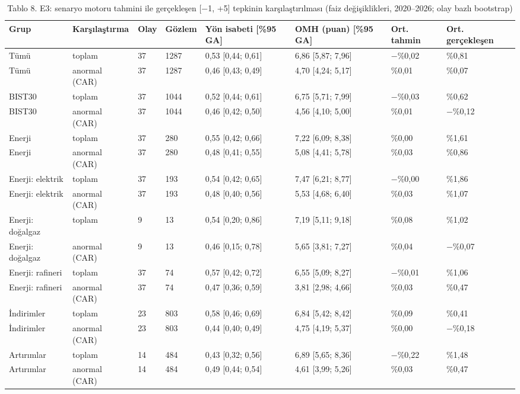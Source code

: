 \begin{table}
\caption{Tablo 8. E3: senaryo motoru tahmini ile gerçekleşen [−1, +5] tepkinin karşılaştırılması (faiz değişiklikleri, 2020–2026; olay bazlı bootstrap)}
\label{tab:tablo_08_e3_olay_calismasi}
\begin{tabular}{llllllll}
\toprule
Grup & Karşılaştırma & Olay & Gözlem & Yön isabeti [\%95 GA] & OMH (puan) [\%95 GA] & Ort. tahmin & Ort. gerçekleşen \\
\midrule
Tümü & toplam & 37 & 1287 & 0,53 [0,44; 0,61] & 6,86 [5,87; 7,96] & −\%0,02 & \%0,81 \\
Tümü & anormal (CAR) & 37 & 1287 & 0,46 [0,43; 0,49] & 4,70 [4,24; 5,17] & \%0,01 & \%0,07 \\
BIST30 & toplam & 37 & 1044 & 0,52 [0,44; 0,61] & 6,75 [5,71; 7,99] & −\%0,03 & \%0,62 \\
BIST30 & anormal (CAR) & 37 & 1044 & 0,46 [0,42; 0,50] & 4,56 [4,10; 5,00] & \%0,01 & −\%0,12 \\
Enerji & toplam & 37 & 280 & 0,55 [0,42; 0,66] & 7,22 [6,09; 8,38] & \%0,00 & \%1,61 \\
Enerji & anormal (CAR) & 37 & 280 & 0,48 [0,41; 0,55] & 5,08 [4,41; 5,78] & \%0,03 & \%0,86 \\
Enerji: elektrik & toplam & 37 & 193 & 0,54 [0,42; 0,65] & 7,47 [6,21; 8,77] & −\%0,00 & \%1,86 \\
Enerji: elektrik & anormal (CAR) & 37 & 193 & 0,48 [0,40; 0,56] & 5,53 [4,68; 6,40] & \%0,03 & \%1,07 \\
Enerji: doğalgaz & toplam & 9 & 13 & 0,54 [0,20; 0,86] & 7,19 [5,11; 9,18] & \%0,08 & \%1,02 \\
Enerji: doğalgaz & anormal (CAR) & 9 & 13 & 0,46 [0,15; 0,78] & 5,65 [3,81; 7,27] & \%0,04 & −\%0,07 \\
Enerji: rafineri & toplam & 37 & 74 & 0,57 [0,42; 0,72] & 6,55 [5,09; 8,27] & −\%0,01 & \%1,06 \\
Enerji: rafineri & anormal (CAR) & 37 & 74 & 0,47 [0,36; 0,59] & 3,81 [2,98; 4,66] & \%0,03 & \%0,47 \\
İndirimler & toplam & 23 & 803 & 0,58 [0,46; 0,69] & 6,84 [5,42; 8,42] & \%0,09 & \%0,41 \\
İndirimler & anormal (CAR) & 23 & 803 & 0,44 [0,40; 0,49] & 4,75 [4,19; 5,37] & \%0,00 & −\%0,18 \\
Artırımlar & toplam & 14 & 484 & 0,43 [0,32; 0,56] & 6,89 [5,65; 8,36] & −\%0,22 & \%1,48 \\
Artırımlar & anormal (CAR) & 14 & 484 & 0,49 [0,44; 0,54] & 4,61 [3,99; 5,26] & \%0,03 & \%0,47 \\
\bottomrule
\end{tabular}
\end{table}
